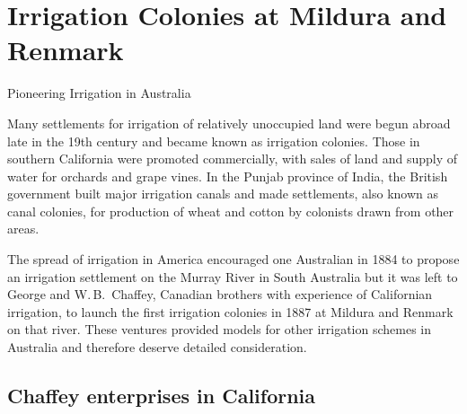 
\setcounter{endnote}{0}

\chapter{Irrigation Colonies at Mildura and Renmark}
\label{ch:colonies}
%
{Pioneering Irrigation in Australia}

Many settlements for irrigation of relatively unoccupied land were
begun abroad late in the 19th century and became known as irrigation
colonies.  Those in southern California  were
promoted commercially, with sales of land and supply of water for
orchards and grape vines.  In the Punjab province of India,
 the British government built major irrigation canals and
made settlements, also known as canal colonies, for production of
wheat and cotton by colonists drawn from other
areas.

The spread of irrigation in America encouraged one Australian in 1884
to propose an irrigation settlement on the Murray River in South
Australia but it was left to George and W.\,B.~Chaffey,
 Canadian
 brothers with experience of Californian irrigation, to
launch the first irrigation colonies in 1887 at Mildura and Renmark on
that river.  These ventures provided models for other irrigation
schemes in Australia and therefore deserve detailed consideration.

\section*{Chaffey enterprises in California}

